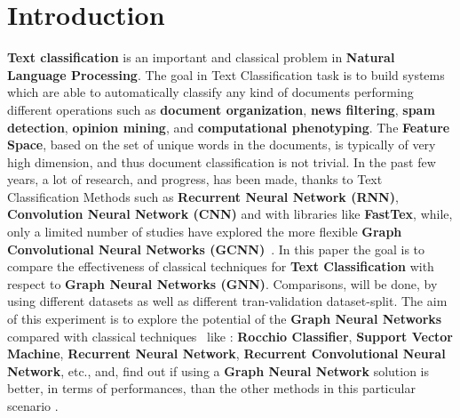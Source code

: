 \section{Introduction}
\textbf{Text classification} is an important and classical problem in \textbf{Natural Language Processing}. \newline
The goal in Text Classification task is to build systems which are able to automatically classify any kind of documents performing different operations such as \textbf{document organization}, \textbf{news filtering}, \textbf{spam detection}, \textbf{opinion mining}, and \textbf{computational phenotyping}.
\newline
The \textbf{Feature Space}, based on the set of unique words in the documents, is typically of very high dimension, and thus document classification is not trivial. 
\newline
In the past few years, a lot of research, and progress, has been made, thanks to Text Classification Methods such as \textbf{Recurrent Neural Network (RNN)}, \textbf{Convolution Neural Network (CNN)} and with libraries like \textbf{FastTex}, while, only a limited number of studies have explored the more flexible \textbf{Graph Convolutional Neural Networks (GCNN)}~\cite{paper-graph-convolution-network}.
\newline
In this paper the goal is to compare the effectiveness of classical techniques for \textbf{Text Classification} with respect to \textbf{Graph Neural Networks (GNN)}. Comparisons, will be done,  by using different datasets as well as different tran-validation dataset-split. The aim of this experiment is to explore the potential of the \textbf{Graph Neural Networks} compared with classical techniques~\cite{paper-text-classification-algorithms} like : \textbf{Rocchio Classifier}, \textbf{Support Vector Machine}, \textbf{Recurrent Neural Network}, \textbf{Recurrent Convolutional Neural Network}, etc., and, find out if using a \textbf{Graph Neural Network} solution is better, in terms of performances, than the other methods in this particular scenario .